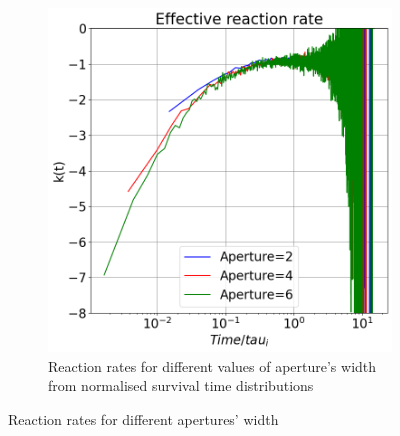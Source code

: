 \documentclass{article}
\begin{document}
\begin{figure}[htbp]
\begin{subfigure}[b]{0.45\textwidth}
        \includegraphics[width=\textwidth]{images/compareApeNormAdsRates.png}
        \caption{Reaction rates for different values of aperture's width from normalised survival time distributions}
    \end{subfigure}
    \caption{Reaction rates for different apertures' width}
    \label{fig:reactionRatesApe}
\end{figure}

\FloatBarrier  %
\end{document}
